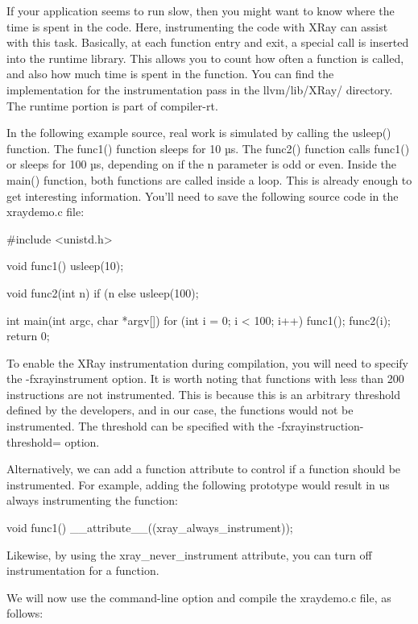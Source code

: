If your application seems to run slow, then you might want to know where the time is spent in the code. Here, instrumenting the code with XRay can assist with this task. Basically, at each function entry and exit, a special call is inserted into the runtime library. This allows you to count how often a function is called, and also how much time is spent in the function. You can find the implementation for the instrumentation pass in the llvm/lib/XRay/ directory. The runtime portion is part of compiler-rt.

In the following example source, real work is simulated by calling the usleep() function. The func1() function sleeps for 10 µs. The func2() function calls func1() or sleeps for 100 µs, depending on if the n parameter is odd or even. Inside the main() function, both functions are called inside a loop. This is already enough to get interesting information. You’ll need to save the following source code in the xraydemo.c file:

\begin{cpp}
#include <unistd.h>

void func1() { usleep(10); }

void func2(int n) {
    if (n %
    else usleep(100);
}

int main(int argc, char *argv[]) {
    for (int i = 0; i < 100; i++) { func1(); func2(i); }
    return 0;
}
\end{cpp}

To enable the XRay instrumentation during compilation, you will need to specify the -fxrayinstrument option. It is worth noting that functions with less than 200 instructions are not instrumented. This is because this is an arbitrary threshold defined by the developers, and in our case, the functions would not be instrumented. The threshold can be specified with the -fxrayinstruction-threshold= option.

Alternatively, we can add a function attribute to control if a function should be instrumented. For example, adding the following prototype would result in us always instrumenting the function:

\begin{cpp}
void func1() __attribute__((xray_always_instrument));
\end{cpp}

Likewise, by using the xray\_never\_instrument attribute, you can turn off instrumentation for a function.

We will now use the command-line option and compile the xraydemo.c file, as follows:

